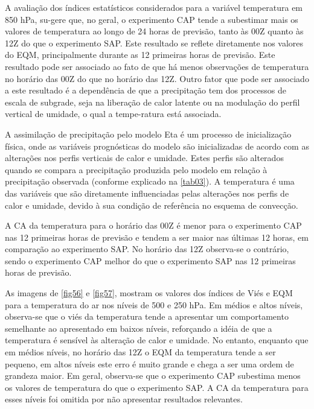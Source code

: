 A avaliação dos índices estatísticos considerados para a variável temperatura em 850 hPa, su-gere que, no geral, o experimento CAP tende a subestimar mais os valores de temperatura ao longo de 24 horas de previsão, tanto às 00Z quanto às 12Z do que o experimento SAP. Este resultado se reflete diretamente nos valores do EQM, principalmente durante as 12 primeiras horas de previsão. Este resultado pode ser associado ao fato de que há menos observações de temperatura no horário das 00Z do que no horário das 12Z. Outro fator que pode ser associado a este resultado é a dependência de que a precipitação tem dos processos de escala de subgrade, seja na liberação de calor latente ou na modulação do perfil vertical de umidade, o qual a tempe-ratura está associada.

A assimilação de precipitação pelo modelo Eta é um processo de inicialização física, onde as variáveis prognósticas do modelo são inicializadas de acordo com as alterações nos perfis verticais de calor e umidade. Estes perfis são alterados quando se compara a precipitação produzida pelo modelo em relação à precipitação observada (conforme explicado na \autoref{tab03}). A temperatura é uma das variáveis que são diretamente influenciadas pelas alterações nos perfis de calor e umidade, devido à sua condição de referência no esquema de convecção. 

A CA da temperatura para o horário das 00Z é menor para o experimento CAP nas 12 primeiras horas de previsão e tendem a ser maior nas últimas 12 horas, em comparação ao experimento SAP. No horário das 12Z observa-se o contrário, sendo o experimento CAP melhor do que o experimento SAP nas 12 primeiras horas de previsão.

As imagens de \autoref{fig56} e \autoref{fig57}, mostram os valores dos índices de Viés e EQM para a temperatura do ar nos níveis de 500 e 250 hPa. Em médios e altos níveis, observa-se que o viés da temperatura tende a apresentar um comportamento semelhante ao apresentado em baixos níveis, reforçando a idéia de que a temperatura é sensível às alteração de calor e umidade. No entanto, enquanto que em médios níveis, no horário das 12Z o EQM da temperatura tende a ser pequeno, em altos níveis este erro é muito grande e chega a ser uma ordem de grandeza maior. Em geral, observa-se que o experimento CAP subestima menos os valores de temperatura do que o experimento SAP. A CA da temperatura para esses níveis foi omitida por não apresentar resultados relevantes.
     
